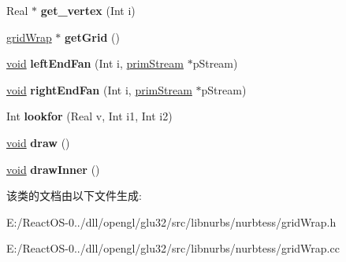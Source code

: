 \begin{DoxyCompactItemize}
\item 
\mbox{\label{classgrid_boundary_chain_a20ad362503de0d945ff837d4d32df62d}} 
Real $\ast$ {\bfseries get\+\_\+vertex} (Int i)
\item 
\mbox{\label{classgrid_boundary_chain_a5264756840fa793b0b0a9a9818ee1bd9}} 
\hyperlink{classgrid_wrap}{grid\+Wrap} $\ast$ {\bfseries get\+Grid} ()
\item 
\mbox{\label{classgrid_boundary_chain_aa807ef66de30974c87b45278680cb97f}} 
\hyperlink{interfacevoid}{void} {\bfseries left\+End\+Fan} (Int i, \hyperlink{classprim_stream}{prim\+Stream} $\ast$p\+Stream)
\item 
\mbox{\label{classgrid_boundary_chain_ad032c182006d1c14ca346fb1a7aea775}} 
\hyperlink{interfacevoid}{void} {\bfseries right\+End\+Fan} (Int i, \hyperlink{classprim_stream}{prim\+Stream} $\ast$p\+Stream)
\item 
\mbox{\label{classgrid_boundary_chain_a5c398f26987264a7883c44f8edea609c}} 
Int {\bfseries lookfor} (Real v, Int i1, Int i2)
\item 
\mbox{\label{classgrid_boundary_chain_ad4d5e87ce4a257717159c9af124ed650}} 
\hyperlink{interfacevoid}{void} {\bfseries draw} ()
\item 
\mbox{\label{classgrid_boundary_chain_a76cbb0d0aaeadb601740ed46fc756379}} 
\hyperlink{interfacevoid}{void} {\bfseries draw\+Inner} ()
\end{DoxyCompactItemize}


该类的文档由以下文件生成\+:\begin{DoxyCompactItemize}
\item 
E\+:/\+React\+O\+S-\/0../dll/opengl/glu32/src/libnurbs/nurbtess/grid\+Wrap.\+h\item 
E\+:/\+React\+O\+S-\/0../dll/opengl/glu32/src/libnurbs/nurbtess/grid\+Wrap.\+cc\end{DoxyCompactItemize}

